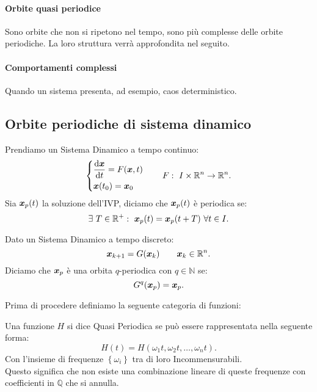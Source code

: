 \paragraph{Orbite quasi periodice}%
\label{par:Orbite quasi periodice}
Sono orbite che non si ripetono nel tempo, sono più complesse delle orbite periodiche. La loro struttura verrà approfondita nel seguito.
\paragraph{Comportamenti complessi}%
\label{par:Comportamenti complessi}
Quando un sistema presenta, ad esempio, caos deterministico.
\subsection{Orbite periodiche di sistema dinamico}%
\label{sub:Orbite periodiche di sistema dinamico}
\begin{defn}
Prendiamo un Sistema Dinamico a tempo continuo:
\[
    \begin{dcases}
	\frac{\text{d} \boldsymbol{x}}{\text{d} t} = F(\boldsymbol{x}, t)\\
	\boldsymbol{x} (t_0) = \boldsymbol{x}_0
    \end{dcases}
    \qquad
    F: \ I \times \mathbb{R}^n \to \mathbb{R}^n
.\] 
 Sia $\boldsymbol{x}_p(t)$ la soluzione dell'IVP, diciamo che $\boldsymbol{x}_p(t)$ è periodica se:
\[
    \exists \ T \in \mathbb{R}^+: \ \boldsymbol{x}_p(t) = \boldsymbol{x}_p (t + T) \  \forall t \in I
.\]    
\end{defn}
\noindent
\begin{defn}
    Dato un Sistema Dinamico a tempo discreto:
    \[
	\boldsymbol{x}_{k+1} = G(\boldsymbol{x}_k) \qquad \boldsymbol{x}_k \in \mathbb{R}^n
    .\] 
    Diciamo che $\boldsymbol{x}_p$ è una orbita $q$-periodica con $q \in \mathbb{N}$ se:
    \[
	G^{q} (\boldsymbol{x}_p) = \boldsymbol{x}_p
    .\] 
\end{defn}
\noindent
Prima di procedere definiamo la seguente categoria di funzioni:
\begin{defn}
    Una funzione $H$ si dice Quasi Periodica se può essere rappresentata nella seguente forma:
    \[
	H(t) = H(\omega_1t, \omega_2t, \ldots, \omega_nt)
    .\] 
    Con l'insieme di frequenze $\left\{\omega_i\right\}$ tra di loro Incommensurabili.\\
    Questo significa che non esiste una combinazione lineare di queste frequenze con coefficienti in $\mathbb{Q}$ che si annulla.
\end{defn}
